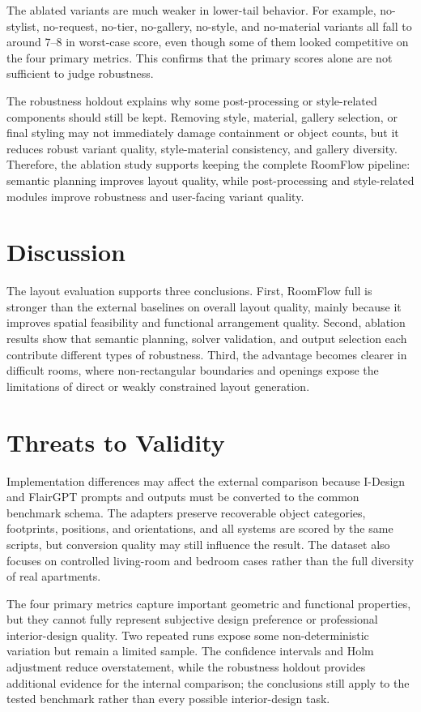 The ablated variants are much weaker in lower-tail behavior. For example, no-stylist, no-request, no-tier, no-gallery, no-style, and no-material variants all fall to around 7--8 in worst-case score, even though some of them looked competitive on the four primary metrics. This confirms that the primary scores alone are not sufficient to judge robustness.

The robustness holdout explains why some post-processing or style-related components should still be kept. Removing style, material, gallery selection, or final styling may not immediately damage containment or object counts, but it reduces robust variant quality, style-material consistency, and gallery diversity. Therefore, the ablation study supports keeping the complete RoomFlow pipeline: semantic planning improves layout quality, while post-processing and style-related modules improve robustness and user-facing variant quality.

\section{Discussion}\label{subsec:eval-layout-discussion}

The layout evaluation supports three conclusions. First, RoomFlow full is stronger than the external baselines on overall layout quality, mainly because it improves spatial feasibility and functional arrangement quality. Second, ablation results show that semantic planning, solver validation, and output selection each contribute different types of robustness. Third, the advantage becomes clearer in difficult rooms, where non-rectangular boundaries and openings expose the limitations of direct or weakly constrained layout generation.

\section{Threats to Validity}\label{sec:eval-layout-threats}

Implementation differences may affect the external comparison because I-Design and FlairGPT prompts and outputs must be converted to the common benchmark schema. The adapters preserve recoverable object categories, footprints, positions, and orientations, and all systems are scored by the same scripts, but conversion quality may still influence the result. The dataset also focuses on controlled living-room and bedroom cases rather than the full diversity of real apartments.

The four primary metrics capture important geometric and functional properties, but they cannot fully represent subjective design preference or professional interior-design quality. Two repeated runs expose some non-deterministic variation but remain a limited sample. The confidence intervals and Holm adjustment reduce overstatement, while the robustness holdout provides additional evidence for the internal comparison; the conclusions still apply to the tested benchmark rather than every possible interior-design task.
